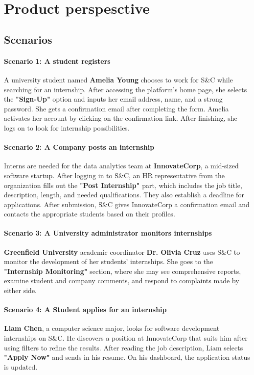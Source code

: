 \section{Product perspesctive}
\label{sec:product_perspesctive}%

\subsection{Scenarios}
\label{subsec:scenarios}%
\paragraph{Scenario 1: A student registers}
A university student named \textbf{Amelia Young} chooses to work for S\&C while searching for an internship. After accessing the platform's home page, she selects the \textbf{"Sign-Up"} option and inputs her email address, name, and a strong password. She gets a confirmation email after completing the form. Amelia activates her account by clicking on the confirmation link. After finishing, she logs on to look for internship possibilities.

\paragraph{Scenario 2: A Company posts an internship}
Interns are needed for the data analytics team at \textbf{InnovateCorp}, a mid-sized software startup. After logging in to S\&C, an HR representative from the organization fills out the \textbf{"Post Internship"} part, which includes the job title, description, length, and needed qualifications. They also establish a deadline for applications. After submission, S\&C gives InnovateCorp a confirmation email and contacts the appropriate students based on their profiles.

\paragraph{Scenario 3: A University administrator monitors internships}
\textbf{Greenfield University} academic coordinator \textbf{Dr. Olivia Cruz} uses S\&C to monitor the development of her students' internships. She goes to the \textbf{"Internship Monitoring"} section, where she may see comprehensive reports, examine student and company comments, and respond to complaints made by either side.
 

\paragraph{Scenario 4: A Student applies for an internship}
\textbf{Liam Chen}, a computer science major, looks for software development internships on S\&C. He discovers a position at InnovateCorp that suits him after using filters to refine the results. After reading the job description, Liam selects \textbf{"Apply Now"} and sends in his resume. On his dashboard, the application status is updated.

